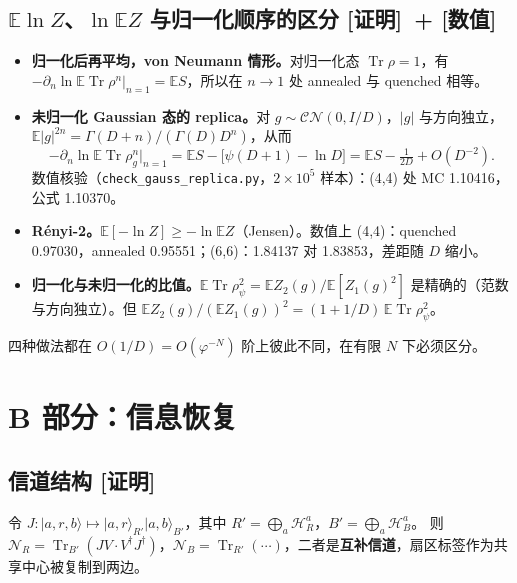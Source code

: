\documentclass[11pt,a4paper,UTF8]{ctexart}
\newcommand{\Tr}{\operatorname{Tr}}
\newcommand{\E}{\mathbb{E}}
\newcommand{\code}[1]{\texttt{#1}}
\newcommand{\tagP}{\texorpdfstring{\textcolor{cP}{\textbf{[证明]}}}{[证明]}}
\newcommand{\tagN}{\texorpdfstring{\textcolor{cN}{\textbf{[数值]}}}{[数值]}}
\begin{document}
\subsection{\texorpdfstring{$\E\ln Z$、$\ln\E Z$}{E ln Z、ln E Z} 与归一化顺序的区分 \tagP\ + \tagN}\label{ss:A-conv}
\begin{itemize}
  \item \textbf{归一化后再平均，von Neumann 情形。}对归一化态 $\Tr\rho=1$，有 $-\partial_n\ln\E\Tr\rho^n|_{n=1}=\E S$，所以在 $n\to1$ 处 annealed 与 quenched 相等。
  \item \textbf{未归一化 Gaussian 态的 replica。}对 $g\sim\mathcal{CN}(0,I/D)$，$|g|$ 与方向独立，$\E|g|^{2n}=\Gamma(D+n)/(\Gamma(D)D^n)$，从而
  \[
  -\partial_n\ln\E\Tr\rho_g^n\big|_{n=1}=\E S-\big[\psi(D+1)-\ln D\big]=\E S-\tfrac1{2D}+O(D^{-2}).
  \]
  数值核验（\code{check\_gauss\_replica.py}，$2\times10^5$ 样本）：(4,4) 处 MC 1.10416，公式 1.10370。
  \item \textbf{Rényi-2。}$\E[-\ln Z]\ge-\ln\E Z$（Jensen）。数值上 (4,4)：quenched 0.97030，annealed 0.95551；(6,6)：1.84137 对 1.83853，差距随 $D$ 缩小。
  \item \textbf{归一化与未归一化的比值。}$\E\Tr\rho_\psi^2=\E Z_2(g)/\E[Z_1(g)^2]$ 是精确的（范数与方向独立）。但 $\E Z_2(g)/(\E Z_1(g))^2=(1+1/D)\,\E\Tr\rho_\psi^2$。
\end{itemize}
四种做法都在 $O(1/D)=O(\varphi^{-N})$ 阶上彼此不同，在有限 $N$ 下必须区分。

\section{B 部分：信息恢复}\label{sec:B}

\subsection{信道结构 \tagP}\label{ss:B-channel}
令 $J:|a,r,b\rangle\mapsto|a,r\rangle_{R'}|a,b\rangle_{B'}$，其中 $R'=\bigoplus_a\mathcal H^a_R$，$B'=\bigoplus_a\mathcal H^a_B$。
则 $\mathcal N_R=\Tr_{B'}(JV\cdot V^\dagger J^\dagger)$，$\mathcal N_B=\Tr_{R'}(\cdots)$，二者是\textbf{互补信道}，扇区标签作为共享中心被复制到两边。
\end{document}
